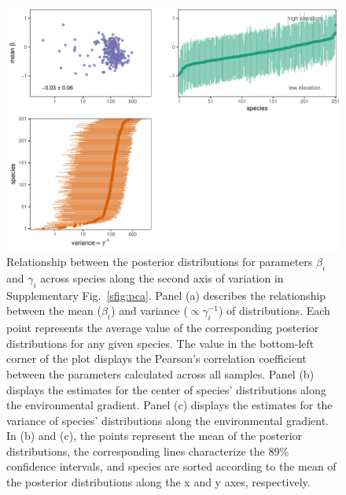 \documentclass[11pt, a4paper]{article}
\begin{document}
\begin{figure}[ht]
  \centering
    \vspace{0.5cm}
    \includegraphics[width=1\textwidth]{figures/figure1-secondaxis}
    	  \vspace{0.3cm}
	   \caption{Relationship between the posterior distributions for parameters $\beta_i$ and $\gamma_i$ across species along the second axis of variation in Supplementary Fig.~\ref{sfig:pca}. Panel (a) describes the relationship between the mean ($\beta_i$) and variance ($\propto\gamma_i^{-1}$) of distributions. Each point represents the average value of the corresponding posterior distributions for any given species. The value in the bottom-left corner of the plot displays the Pearson's correlation coefficient between the parameters calculated across all samples. Panel (b) displays the estimates for the center of species' distributions along the environmental gradient. Panel (c) displays the estimates for the variance of species' distributions along the environmental gradient. In (b) and (c), the points represent the mean of the posterior distributions, the corresponding lines characterize the 89\% confidence intervals, and species are sorted according to the mean of the posterior distributions along the x and y axes, respectively.}
      \label{sfig:secondaxis}
\end{figure}


\clearpage
\end{document}
